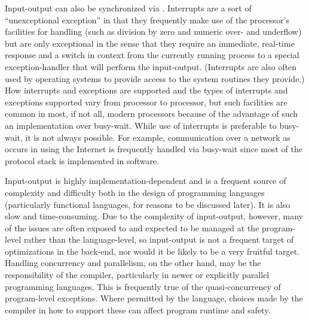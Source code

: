Input-output can also be synchronized via . Interrupts are a sort of ``unexceptional exception'' in that they frequently make use of the processor's facilities for handling  (such as division by zero and numeric over- and underflow) but are only exceptional in the sense that they require an immediate, real-time response and a switch in context from the currently running process to a special exception-handler that will perform the input-output. (Interrupts are also often used by operating systems to provide access to the system routines they provide.) How interrupts and exceptions are supported and the types of interrupts and exceptions supported vary from processor to processor, but such facilities are common in most, if not all, modern processors because of the advantage of such an implementation over busy-wait. While use of interrupts is preferable to busy-wait, it is not always possible. For example, communication over a network as occurs in using the Internet is frequently handled via busy-wait since most of the protocol stack is implemented in software.

Input-output is highly implementation-dependent and is a frequent source of complexity and difficulty both in the design of programming languages (particularly functional languages, for reasons to be discussed later). %
It is also slow and time-consuming. Due to the complexity of input-output, however, many of the issues are often exposed to and expected to be managed at the program-level rather than the language-level, so input-output is not a frequent target of optimizations in the back-end, nor would it be likely to be a very fruitful target. Handling concurrency and parallelism, on the other hand, may be the responsibility of the compiler, particularly in newer or explicitly parallel programming languages. This is frequently true of the quasi-concurrency of program-level exceptions. Where permitted by the language, choices made by the compiler in how to support these can affect program runtime and safety.
